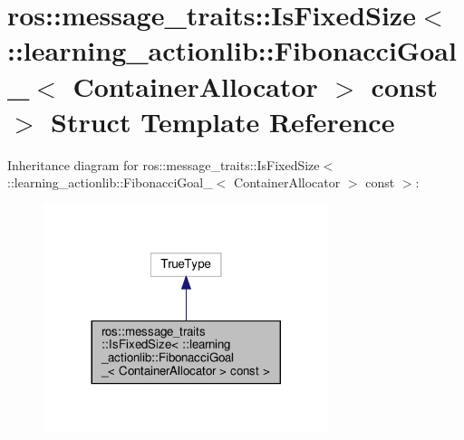 \hypertarget{structros_1_1message__traits_1_1IsFixedSize_3_01_1_1learning__actionlib_1_1FibonacciGoal___3_01C1f4771e704c7b495564695636a06df33}{}\section{ros\+:\+:message\+\_\+traits\+:\+:Is\+Fixed\+Size$<$ \+:\+:learning\+\_\+actionlib\+:\+:Fibonacci\+Goal\+\_\+$<$ Container\+Allocator $>$ const $>$ Struct Template Reference}
\label{structros_1_1message__traits_1_1IsFixedSize_3_01_1_1learning__actionlib_1_1FibonacciGoal___3_01C1f4771e704c7b495564695636a06df33}


Inheritance diagram for ros\+:\+:message\+\_\+traits\+:\+:Is\+Fixed\+Size$<$ \+:\+:learning\+\_\+actionlib\+:\+:Fibonacci\+Goal\+\_\+$<$ Container\+Allocator $>$ const $>$\+:
\nopagebreak
\begin{figure}[H]
\begin{center}
\leavevmode
\includegraphics[width=236pt]{structros_1_1message__traits_1_1IsFixedSize_3_01_1_1learning__actionlib_1_1FibonacciGoal___3_01C41c2cc7cdd97f716bdfb19bb4dda3264}
\end{center}
\end{figure}


